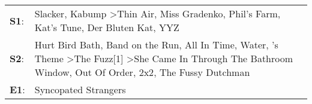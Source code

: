 \begin{supertabular}{p{0.03\textwidth}p{0.92\textwidth}}
 \textbf{S1}:  &                                                                                                                                          Slacker\textsuperscript{}, \enspace Kabump\textsuperscript{} \textgreater \enspace Thin Air\textsuperscript{}, \enspace Miss Gradenko\textsuperscript{}, \enspace Phil's Farm\textsuperscript{}, \enspace Kat's Tune\textsuperscript{}, \enspace Der Bluten Kat\textsuperscript{}, \enspace YYZ\textsuperscript{}  \enspace  \\
 \textbf{S2}:  &  Hurt Bird Bath\textsuperscript{}, \enspace Band on the Run\textsuperscript{}, \enspace All In Time\textsuperscript{}, \enspace Water\textsuperscript{}, 's Theme\textsuperscript{} \textgreater \enspace The Fuzz[1]\textsuperscript{} \textgreater \enspace She Came In Through The Bathroom Window\textsuperscript{}, \enspace Out Of Order\textsuperscript{}, \enspace 2x2\textsuperscript{}, \enspace The Fussy Dutchman\textsuperscript{}  \enspace  \\
 \textbf{E1}:  &                                                                                                                                                                                                                                                                                                                                                                                                                     Syncopated Strangers\textsuperscript{}  \enspace  \\
\end{supertabular}

